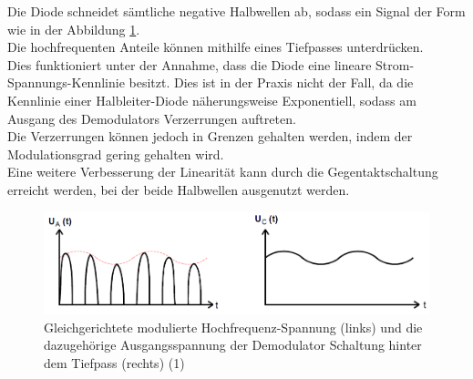\documentclass[]{scrartcl}
\begin{document}
Die Diode schneidet sämtliche negative Halbwellen ab, sodass ein Signal der Form wie in der Abbildung \ref{fig:AusgangsspannungDemodulationDiode}.\\
Die hochfrequenten Anteile können mithilfe eines Tiefpasses unterdrücken.\\
Dies funktioniert unter der Annahme, dass die Diode eine lineare Strom-Spannungs-Kennlinie besitzt. Dies ist in der Praxis nicht der Fall, da die Kennlinie einer Halbleiter-Diode näherungsweise Exponentiell, sodass am Ausgang des Demodulators Verzerrungen auftreten.\\
Die Verzerrungen können jedoch in Grenzen gehalten werden, indem der Modulationsgrad gering gehalten wird. \\
Eine weitere Verbesserung der Linearität kann durch die Gegentaktschaltung erreicht werden, bei der beide Halbwellen ausgenutzt werden.
\begin{figure}[H]
\centering 
\includegraphics[width=14cm]{images/AusgangsspannungDemodulationDiode.png}
\caption{Gleichgerichtete modulierte Hochfrequenz-Spannung (links) und die dazugehörige Ausgangsspannung der Demodulator Schaltung hinter dem Tiefpass (rechts) (1)}
\label{fig:AusgangsspannungDemodulationDiode}
\end{figure}
\end{document}
